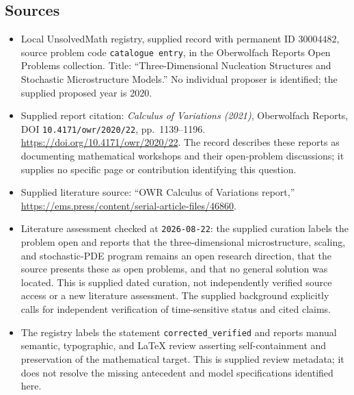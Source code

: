 \documentclass[11pt]{article}
\begin{document}
\subsection{Sources}
\begin{itemize}
\item Local UnsolvedMath registry, supplied record with permanent ID \(30004482\), source problem code \texttt{catalogue entry}, in the Oberwolfach Reports Open Problems collection. Title: ``Three-Dimensional Nucleation Structures and Stochastic Microstructure Models.'' No individual proposer is identified; the supplied proposed year is 2020.
\item Supplied report citation: \emph{Calculus of Variations (2021)}, Oberwolfach Reports, DOI \texttt{10.4171/owr/2020/22}, pp.~1139--1196. \url{https://doi.org/10.4171/owr/2020/22}. The record describes these reports as documenting mathematical workshops and their open-problem discussions; it supplies no specific page or contribution identifying this question.
\item Supplied literature source: ``OWR Calculus of Variations report,'' \url{https://ems.press/content/serial-article-files/46860}.
\item Literature assessment checked at \texttt{2026-08-22}: the supplied curation labels the problem open and reports that the three-dimensional microstructure, scaling, and stochastic-PDE program remains an open research direction, that the source presents these as open problems, and that no general solution was located. This is supplied dated curation, not independently verified source access or a new literature assessment. The supplied background explicitly calls for independent verification of time-sensitive status and cited claims.
\item The registry labels the statement \texttt{corrected\_verified} and reports manual semantic, typographic, and LaTeX review asserting self-containment and preservation of the mathematical target. This is supplied review metadata; it does not resolve the missing antecedent and model specifications identified here.
\end{itemize}
\end{document}
